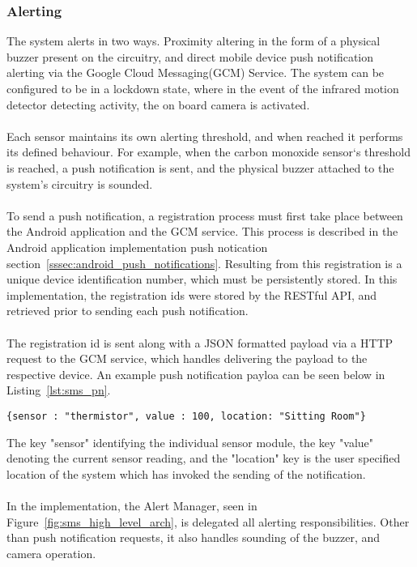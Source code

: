 \documentclass{article}
\begin{document}
\subsubsection{Alerting}
The system alerts in two ways. Proximity altering in the form of a physical buzzer present on the circuitry, and direct mobile device push notification alerting via the Google Cloud Messaging(GCM) Service. The system can be configured to be in a lockdown state, where in the event of the infrared motion detector detecting activity, the on board camera is activated. \\\\
Each sensor maintains its own alerting threshold, and when reached it performs its defined behaviour. For example, when the carbon monoxide sensor\lq s threshold is reached, a push notification is sent, and the physical buzzer attached to the system’s circuitry is sounded. \\\\
To send a push notification, a registration process must first take place between the Android application and the GCM service. This process is described in the Android application implementation push notication section~\ref{sssec:android_push_notifications}. Resulting from this registration is a unique device identification number, which must be persistently stored. In this implementation, the registration ids were stored by the RESTful API, and retrieved prior to sending each push notification. \\\\
The registration id is sent along with a JSON formatted payload via a HTTP request to the GCM service, which handles delivering the payload to the respective device. An example push notification payloa can be seen below in Listing~\ref{lst:sms_pn}.
\begin{center}
\begin{lstlisting}[caption={JSON push notification payload example},label={lst:sms_pn}]
{sensor : "thermistor", value : 100, location: "Sitting Room"}
\end{lstlisting}
\end{center}
The key "sensor" identifying the individual sensor module, the key "value" denoting the current sensor reading, and the "location" key is the user specified location of the system which has invoked the sending of the notification. \\\\
In the implementation, the Alert Manager, seen in Figure~\ref{fig:sms_high_level_arch}, is delegated all alerting responsibilities. Other than push notification requests, it also handles sounding of the buzzer, and camera operation. 
\end{document}
